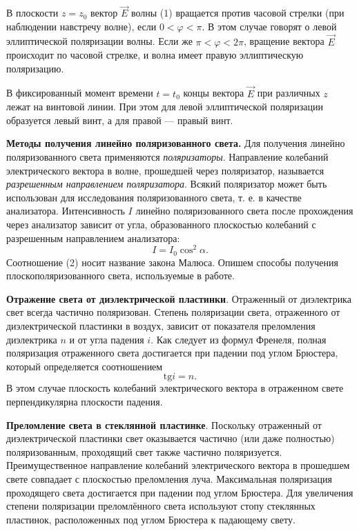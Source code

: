 \documentclass[a4paper,12pt]{article}
\begin{document}
	В плоскости $z = z_0$ вектор $\vec{E}$ волны (1) вращается против часовой стрелки (при наблюдении навстречу волне), если $0 < \varphi < \pi$. В этом случае говорят о левой эллиптической поляризации волны. Если же
	$\pi < \varphi < 2\pi$, вращение вектора $\vec{E}$ происходит по часовой стрелке, и волна имеет правую эллиптическую поляризацию.
	
	
	В фиксированный момент времени $t = t_0$ концы вектора $\vec{E}$ при различных $z$ лежат на винтовой линии. При этом для левой эллиптической поляризации образуется левый винт, а для правой --- правый винт.
	
	\textbf{Методы получения линейно поляризованного света.} Для получения линейно поляризованного света применяются \textit{поляризаторы}. Направление колебаний электрического вектора в волне, прошедшей через поляризатор, называется \textit{разрешенным направлением поляризатора}. Всякий поляризатор может быть использован для исследования поляризованного света, т. е. в качестве анализатора. Интенсивность $I$ линейно поляризованного света после прохождения через анализатор зависит от угла, образованного плоскостью колебаний с разрешенным направлением анализатора:
	\begin{equation}
	I = I_0 \cos^2\alpha.
	\end{equation}
	Соотношение (2) носит название закона Малюса. Опишем способы получения плоскополяризованного света, используемые в работе.
	
	\textbf{Отражение света от диэлектрической пластинки}. Отраженный от диэлектрика свет всегда частично поляризован. Степень поляризации света, отраженного от диэлектрической пластинки в воздух, зависит от показателя преломления диэлектрика $n$ и от угла падения $i$. Как следует из формул Френеля, полная поляризация отраженного света достигается при падении под углом Брюстера, который определяется соотношением
	\begin{equation}
	\text{tg}i = n.
	\end{equation}
	В этом случае плоскость колебаний электрического вектора в отраженном свете перпендикулярна плоскости падения.
	
	\textbf{Преломление света в стеклянной пластинке}. Поскольку отраженный от
	диэлектрической пластинки свет оказывается частично (или даже полностью) поляризованным, проходящий свет также частично поляризуется. Преимущественное направление колебаний электрического вектора
	в прошедшем свете совпадает с плоскостью преломления луча. Максимальная поляризация проходящего света достигается при падении под
	углом Брюстера. Для увеличения степени поляризации преломлённого
	света используют стопу стеклянных пластинок, расположенных под углом Брюстера к падающему свету.
	
\end{document}
